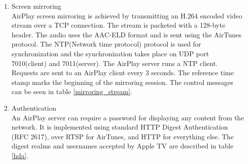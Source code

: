 \begin{enumerate}
\item Screen mirroring \\ 
AirPlay screen mirroring is achieved by transmitting an H.264 encoded video stream 
over a TCP connection. The stream is packeted with a 128-byte header. The 
audio uses the AAC-ELD format and is sent using the AirTunes protocol. 
The NTP(Network time protocol) protocol is used for synchronization and the synchronization 
takes place on UDP port 7010(client) and 7011(server). The 
AirPlay server runs a NTP client. Requests are sent to an AirPlay client every 3 
seconds. The reference time stamp marks the beginning of the 
mirroring session.  The control messages can be seen in table 
\ref{mirroring_stream}. 
\begin{table}[htb] 
\caption{AirPlay Mirroring Control HTTP requests \label{mirroring_stream}} 
\begin{center} 
\end{center} 
\end{table} 
\item Authentication \\ 
An AirPlay server can require a password for displaying any content from the 
network. It is implemented using standard HTTP Digest Authentication (RFC 2617), 
over RTSP for AirTunes, and HTTP for everything else. The digest realms and 
usernames accepted by Apple TV are described in table \ref{hda}. 
\begin{table}[htb] 
\caption{AirPlay HTTP Digest Authentication \label{hda}} 
\begin{center} 
\end{center} 
\end{table} 
\end{enumerate} 

